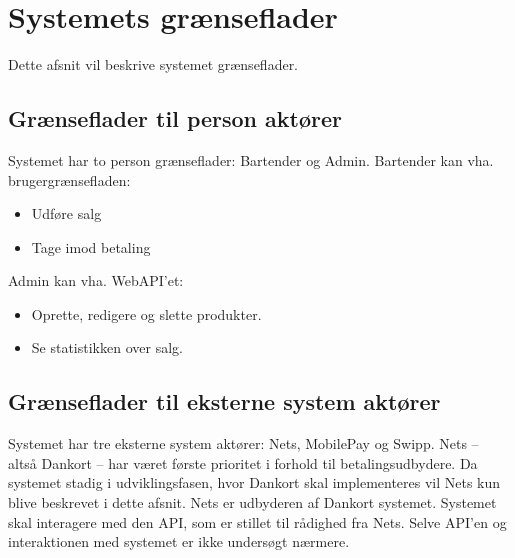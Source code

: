 \section{Systemets grænseflader}
Dette afsnit vil beskrive systemet grænseflader.

\subsection{Grænseflader til person aktører}
Systemet har to person grænseflader: Bartender og Admin.
\newline\newline
Bartender kan vha. brugergrænsefladen:
\begin{itemize}
	\item Udføre salg
	\item Tage imod betaling
\end{itemize}

Admin kan vha. WebAPI'et:
\begin{itemize}
	\item Oprette, redigere og slette produkter.
    \item Se statistikken over salg.
\end{itemize}

\subsection{Grænseflader til eksterne system aktører}
Systemet har tre eksterne system aktører: Nets, MobilePay og Swipp. Nets -- altså Dankort -- har været første prioritet i forhold til betalingsudbydere. Da systemet stadig i udviklingsfasen, hvor Dankort skal implementeres vil Nets kun blive beskrevet i dette afsnit.
\newline\newline
Nets er udbyderen af Dankort systemet. Systemet skal interagere med den API, som er stillet til rådighed fra Nets. Selve API'en og interaktionen med systemet er ikke undersøgt nærmere. 


